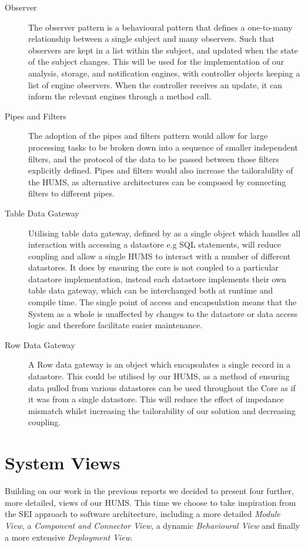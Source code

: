 \documentclass[10pt,a4paper]{article}
\begin{document}
\begin{description}
\item[Observer] The observer pattern is a behavioural pattern that defines a one-to-many relationship between a single subject and many observers. Such that observers are kept in a list within the subject, and updated when the state of the subject changes. This will be used for the implementation of our analysis, storage, and notification engines, with controller objects keeping a list of engine observers. When the controller receives an update, it can inform the relevant engines through a method call.
\item[Pipes and Filters]The adoption of the pipes and filters pattern would allow for large processing tasks to be broken down into a sequence of smaller independent filters, and the protocol of the data to be passed between those filters explicitly defined. Pipes and filters would also increase the tailorability of the HUMS, as alternative architectures can be composed by connecting filters to different pipes. 
\item[Table Data Gateway]  Utilising table data gateway, defined by \cite{fowler2002patterns} as a single object which handles all interaction with accessing a datastore e.g SQL statements, will reduce coupling and allow a single HUMS to interact with a number of different datastores. It does by ensuring the core is not coupled to a particular datastore implementation, instead each datastore implements their own table data gateway, which can be interchanged both at runtime and compile time. The single point of access and encapsulation means that the System as a whole is unaffected by changes to the datastore or data access logic and therefore facilitate easier maintenance.
\item[Row Data Gateway] A Row data gateway is an object which encapsulates a single record in a datastore\cite{fowler2002patterns}. This could be utilised by our HUMS, as a method of ensuring data pulled from various datastores can be used throughout the Core as if it was from a single datastore. This will reduce the effect of impedance mismatch whilst increasing the tailorability of our solution and decreasing coupling.
\end{description}

\section{System Views} 
Building on our work in the previous reports we decided to present four further, more detailed, views of our HUMS. This time we choose to take inspiration from the SEI \cite{Bass98} approach to software architecture, including a more detailed \emph{Module View}, a \emph{Component and Connector View}, a dynamic \emph{Behavioural View} and finally a more extensive \emph{Deployment View}.
\end{document}
